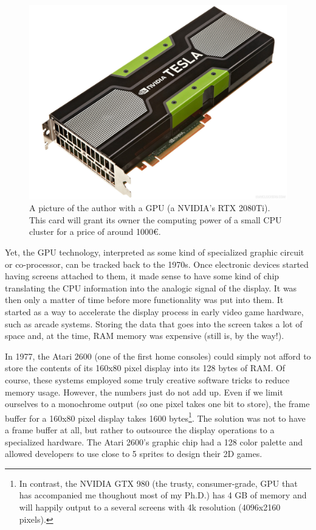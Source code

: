 \documentclass[ twoside,openright,titlepage,numbers=noenddot,%
headinclude,footinclude,cleardoublepage=empty,abstract=on,
BCOR=5mm,paper=a4,fontsize=11pt, dvipsnames
]{scrreprt}
\newcommand{\gpu}{\gls{GPU}\xspace}
\begin{document}
\begin{figure}
  \centering
  \includegraphics[width=\textwidth]{gpu_and_me}
  \caption{A picture of the author with a GPU (a NVIDIA's RTX 2080Ti). This card will grant its owner the computing power of a small CPU cluster for a price of around 1000€.}
  \label{fig:gpuandme}
\end{figure}

Yet, the \gpu technology, interpreted as some kind of specialized graphic circuit or co-processor, can be tracked back to the 1970s. Once electronic devices started having screens attached to them, it made sense to have some kind of chip translating the CPU information into the analogic signal of the display. It was then only a matter of time before more functionality was put into them. It started as a way to accelerate the display process in early video game hardware, such as arcade systems.
Storing the data that goes into the screen takes a lot of space and, at the time, RAM memory was expensive (still is, by the way!).

In 1977, the Atari 2600 (one of the first home consoles) could simply not afford to store the contents of its 160x80 pixel display into its 128 bytes of RAM. Of course, these systems employed some truly creative software tricks to reduce memory usage. However, the numbers just do not add up. Even if we limit ourselves to a monochrome output (so one pixel takes one bit to store), the frame buffer for a 160x80 pixel display takes 1600 bytes\footnote{In contrast, the NVIDIA GTX 980 (the trusty, consumer-grade, GPU that has accompanied me thoughout most of my Ph.D.) has 4 GB of memory and will happily output to a several screens with 4k resolution (4096x2160 pixels).}.
The solution was not to have a frame buffer at all, but rather to outsource the display operations to a specialized hardware. The Atari 2600's graphic chip had a 128 color palette and allowed developers to use close to 5 sprites to design their 2D games.
\end{document}
